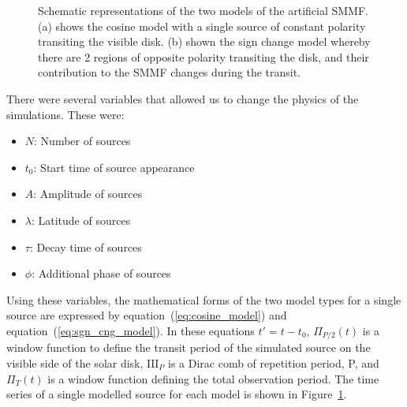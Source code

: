 \begin{figure}
	\centering
	\qquad
	\caption{Schematic representations of the two models of the artificial SMMF. (a) shows the cosine model with a single source of constant polarity transiting the visible disk. (b) shown the sign change model whereby there are 2 regions of opposite polarity transiting the disk, and their contribution to the SMMF changes during the transit.}  \label{fig:artificial_models}
\end{figure}


There were several variables that allowed us to change the physics of the simulations. These were:

\begin{itemize}
	\item{{\bf $N$}: Number of sources}
	\item{{\bf $t_0$}: Start time of source appearance}
	\item{{\bf $A$}: Amplitude of sources}
	\item{{\bf $\lambda$}: Latitude of sources}
	\item{{\bf $\tau$}: Decay time of sources}
	\item{{\bf $\phi$}: Additional phase of sources}
\end{itemize}

Using these variables, the mathematical forms of the two model types for a single source are expressed by equation~(\ref{eq:cosine_model}) and equation~(\ref{eq:sgn_cng_model}). In these equations $t' = t - t_0$, $\Pi_{P/2}(t)$ is a window function to define the transit period of the simulated source on the visible side of the solar disk, $\mathrm{III}_{P}$ is a Dirac comb of repetition period, P, and $\Pi_{T}(t)$ is a window function defining the total observation period. The time series of a single modelled source for each model is shown in Figure~\ref{fig:artificial_models}.

